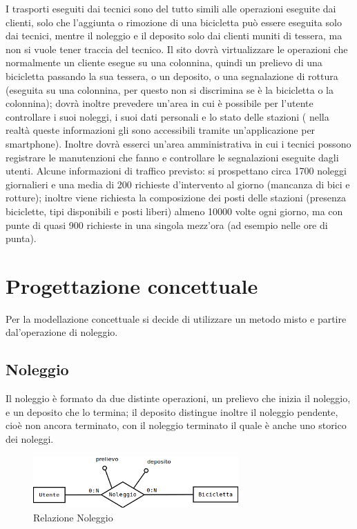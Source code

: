 \documentclass[a4paper,twoside]{article}
\begin{document}
I trasporti eseguiti dai tecnici sono del tutto simili alle operazioni eseguite dai clienti, solo che l'aggiunta o rimozione di una bicicletta può essere eseguita solo dai tecnici, mentre il noleggio e il deposito solo dai clienti muniti di tessera, ma non si vuole tener traccia del tecnico.\newline
Il sito dovrà virtualizzare le operazioni che normalmente un cliente esegue su una colonnina, quindi un prelievo di una bicicletta passando la sua tessera, o un deposito, o una segnalazione di rottura (eseguita su una colonnina, per questo non si discrimina se è la bicicletta o la colonnina); dovrà inoltre prevedere un'area in cui è possibile per l'utente controllare i suoi noleggi, i suoi dati personali e lo stato delle stazioni ( nella realtà queste informazioni gli sono accessibili tramite un'applicazione per smartphone). Inoltre dovrà esserci un'area amministrativa in cui i tecnici possono registrare le manutenzioni che fanno e controllare le segnalazioni eseguite dagli utenti.\newline
Alcune informazioni di traffico previsto: si prospettano circa 1700 noleggi giornalieri e una media di 200 richieste d'intervento al giorno (mancanza di bici e rotture); inoltre viene richiesta la composizione dei posti delle stazioni (presenza biciclette, tipi disponibili e posti liberi) almeno 10000 volte ogni giorno, ma con punte di quasi 900 richieste in una singola mezz'ora (ad esempio nelle ore di punta).
\section{Progettazione concettuale}
Per la modellazione concettuale si decide di utilizzare un metodo misto e partire dal'operazione di noleggio.
\subsection{Noleggio}
Il noleggio è formato da due distinte operazioni, un prelievo che inizia il noleggio, e un deposito che lo termina; il deposito distingue inoltre il noleggio pendente, cioè non ancora terminato, con il noleggio terminato il quale è anche uno storico dei noleggi.
\begin{figure}[h]
 \centering
 \includegraphics[width=0.7\textwidth]{Concettuale01}
\caption{Relazione Noleggio}
\end{figure}
\end{document}
